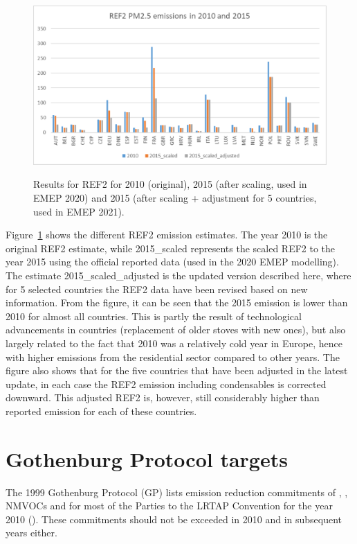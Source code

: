 \begin{figure}[h]
\centering
{\includegraphics*[viewport=1 1 740 400,clip,scale=0.45]{FIGS_CEIP/Fig3.pdf}}
\caption{Results for REF2 for 2010 (original), 2015 (after scaling, used in EMEP 2020) and 2015 (after scaling + adjustment for 5 countries, used in EMEP 2021).}
\label{fig:CEIP3}
\end{figure}


Figure~\ref{fig:CEIP3} shows the different REF2 emission estimates. The year 2010 is the original REF2 estimate, while 2015\_scaled represents the scaled REF2 to the year 2015 using the official reported data (used in the 2020 EMEP modelling). The estimate 2015\_scaled\_adjusted is the updated version described here, where for 5 selected countries the REF2 data have been revised based on new information.
From the figure, it can be seen that the 2015 emission is lower than 2010 for almost all countries. This is partly the result of technological advancements in countries (replacement of older stoves with new ones), but also largely related to the fact that 2010 was a relatively cold year in Europe, hence with higher emissions from the residential sector compared to other years. The figure also shows that for the five countries that have been adjusted in the latest update, in each case the REF2 emission including condensables is corrected downward. This adjusted REF2 is, however, still considerably higher than reported emission for each of these countries.

\section{Gothenburg Protocol targets}
\label{sec:GP}

The 1999 Gothenburg Protocol (GP) lists emission reduction commitments of  \nox,
\sox, NMVOCs and \nhiii for most of the Parties to the LRTAP Convention for the year 2010 (\cite{UNECE1999}). These commitments should not be exceeded in 2010 and in subsequent years either.

